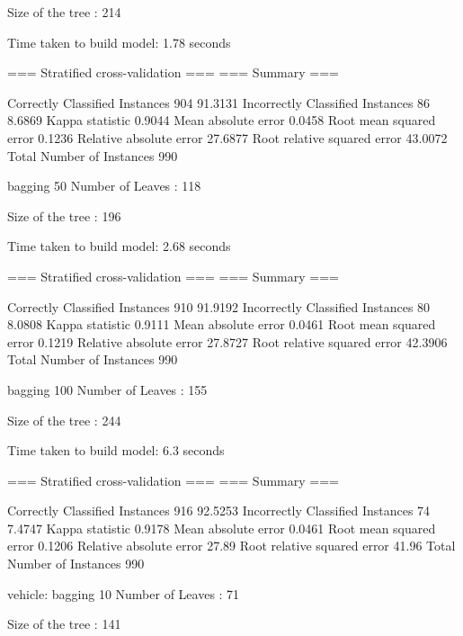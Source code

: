 Size of the tree : 	214




Time taken to build model: 1.78 seconds

=== Stratified cross-validation ===
=== Summary ===

Correctly Classified Instances         904               91.3131 %
Incorrectly Classified Instances        86                8.6869 %
Kappa statistic                          0.9044
Mean absolute error                      0.0458
Root mean squared error                  0.1236
Relative absolute error                 27.6877 %
Root relative squared error             43.0072 %
Total Number of Instances              990     


bagging 50
Number of Leaves  : 	118

Size of the tree : 	196




Time taken to build model: 2.68 seconds

=== Stratified cross-validation ===
=== Summary ===

Correctly Classified Instances         910               91.9192 %
Incorrectly Classified Instances        80                8.0808 %
Kappa statistic                          0.9111
Mean absolute error                      0.0461
Root mean squared error                  0.1219
Relative absolute error                 27.8727 %
Root relative squared error             42.3906 %
Total Number of Instances              990

bagging 100
Number of Leaves  : 	155

Size of the tree : 	244




Time taken to build model: 6.3 seconds

=== Stratified cross-validation ===
=== Summary ===

Correctly Classified Instances         916               92.5253 %
Incorrectly Classified Instances        74                7.4747 %
Kappa statistic                          0.9178
Mean absolute error                      0.0461
Root mean squared error                  0.1206
Relative absolute error                 27.89   %
Root relative squared error             41.96   %
Total Number of Instances              990     



vehicle:
bagging 10
Number of Leaves  : 	71

Size of the tree : 	141




